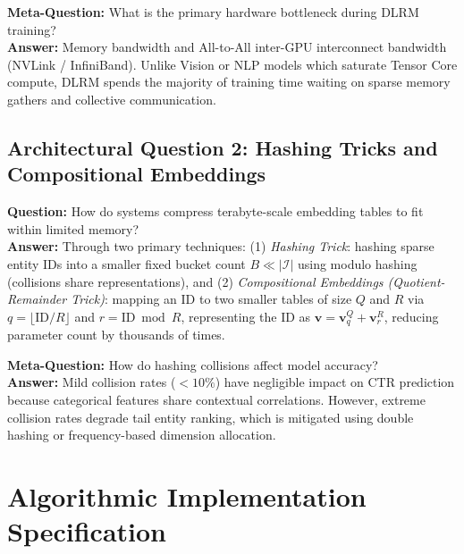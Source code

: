 \documentclass[11pt,a4paper]{article}
\theoremstyle{definition}
\begin{document}
\textbf{Meta-Question:} What is the primary hardware bottleneck during DLRM training?\\
\textbf{Answer:} Memory bandwidth and All-to-All inter-GPU interconnect bandwidth (NVLink / InfiniBand). Unlike Vision or NLP models which saturate Tensor Core compute, DLRM spends the majority of training time waiting on sparse memory gathers and collective communication.

\subsection{Architectural Question 2: Hashing Tricks and Compositional Embeddings}
\textbf{Question:} How do systems compress terabyte-scale embedding tables to fit within limited memory?\\
\textbf{Answer:} Through two primary techniques: (1) \emph{Hashing Trick}: hashing sparse entity IDs into a smaller fixed bucket count $B \ll |\mathcal{I}|$ using modulo hashing (collisions share representations), and (2) \emph{Compositional Embeddings (Quotient-Remainder Trick)}: mapping an ID to two smaller tables of size $Q$ and $R$ via $q = \lfloor \text{ID} / R \rfloor$ and $r = \text{ID} \bmod R$, representing the ID as $\mathbf{v} = \mathbf{v}_q^Q + \mathbf{v}_r^R$, reducing parameter count by thousands of times.

\textbf{Meta-Question:} How do hashing collisions affect model accuracy?\\
\textbf{Answer:} Mild collision rates ($<10\%$) have negligible impact on CTR prediction because categorical features share contextual correlations. However, extreme collision rates degrade tail entity ranking, which is mitigated using double hashing or frequency-based dimension allocation.

\section{Algorithmic Implementation Specification}
\end{document}
